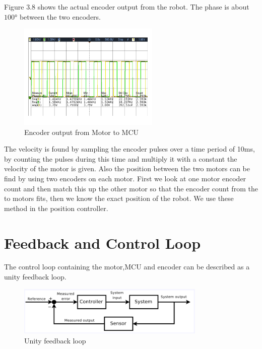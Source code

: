 Figure 3.8 shows the actual encoder output from the robot. The phase is about $\ang{100}$ between the two encoders.
  \begin{figure}[!h!]
	\centering
	\includegraphics[width=0.6\textwidth]{resources/Scop/encoder.png}
	\caption{Encoder output from Motor to MCU}
	\label{fig:6}
\end{figure}
The velocity is found by sampling the encoder pulses over a time period of 10ms, by counting the pulses during this time and multiply it with a constant the velocity of the motor is given.
Also the position between the two motors can be find by using two encoders on each motor. First we look at one motor encoder count and then match this up the other motor so that the encoder count from the to motors fits, then we know the exact position of the robot. We use these method in the position controller.    
\newpage

\section{Feedback and Control Loop}
The control loop containing the motor,MCU and encoder can be described as a unity feedback loop.


  \begin{figure}[!h!]
	\centering
	\includegraphics[width=0.8\textwidth]{resources/feedbackloop.png}
	\caption{Unity feedback loop}
	\label{fig:6}
\end{figure}





